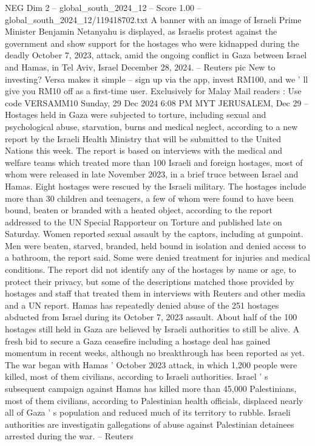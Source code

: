 \begin{textsample}{NEG Dim 2 – global\_south\_2024\_12 – Score 1.00 – global\_south\_2024\_12/119418702.txt}  \label{ex:f2_neg_234}
A banner with an image of Israeli Prime Minister Benjamin Netanyahu is displayed, as Israelis protest against the government and show support for the hostages who were kidnapped during the deadly October 7, 2023, attack, amid the ongoing conflict in Gaza between Israel and Hamas, in Tel Aviv, Israel December 28, 2024. -- Reuters pic New to investing?
Versa makes it simple -- sign up via the app, invest RM100, and we ' ll give you RM10 off as a first-time user.
Exclusively for Malay Mail readers : Use code VERSAMM10 Sunday, 29 Dec 2024 6:08 PM MYT JERUSALEM, Dec 29 -- Hostages held in Gaza were subjected to torture, including sexual and psychological abuse, starvation, burns and medical neglect, according to a new report by the Israeli Health Ministry that will be submitted to the United Nations this week.
The report is based on interviews with the medical and welfare teams which treated more than 100 Israeli and foreign hostages, most of whom were released in late November 2023, in a brief truce between Israel and Hamas.
Eight hostages were rescued by the Israeli military.
The hostages include more than 30 children and teenagers, a few of whom were found to have been bound, beaten or branded with a heated object, according to the report addressed to the UN Special Rapporteur on Torture and published late on Saturday.
Women reported sexual assault by the captors, including at gunpoint.
Men were beaten, starved, branded, held bound in isolation and denied access to a bathroom, the report said.
Some were denied treatment for injuries and medical conditions.
The report did not identify any of the hostages by name or age, to protect their privacy, but some of the descriptions matched those provided by hostages and staff that treated them in interviews with Reuters and other media and a UN report.
Hamas has repeatedly denied abuse of the 251 hostages abducted from Israel during its October 7, 2023 assault.
About half of the 100 hostages still held in Gaza are believed by Israeli authorities to still be alive.
A fresh bid to secure a Gaza ceasefire including a hostage deal has gained momentum in recent weeks, although no breakthrough has been reported as yet.
The war began with Hamas ' October 2023 attack, in which 1,200 people were killed, most of them civilians, according to Israeli authorities.
Israel ' s subsequent campaign against Hamas has killed more than 45,000 Palestinians, most of them civilians, according to Palestinian health officials, displaced nearly all of Gaza ' s population and reduced much of its territory to rubble.
Israeli authorities are investigatin gallegations of abuse against Palestinian detainees arrested during the war. -- Reuters

\end{textsample}
